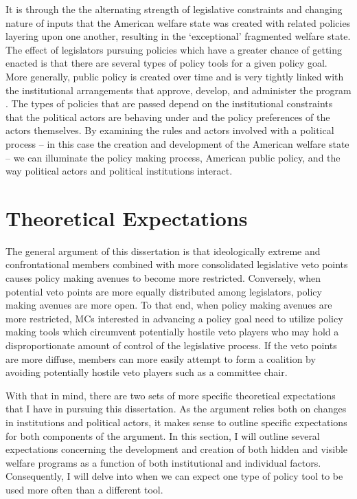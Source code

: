 \documentclass[12pt]{article}
\begin{document}
It is through the the alternating strength of legislative constraints and changing nature of inputs that the American welfare state was created with related policies layering upon one another, resulting in the `exceptional' fragmented welfare state. The effect of legislators pursuing policies which have a greater chance of getting enacted is that there are several types of policy tools for a given policy goal. More generally, public policy is created over time and is very tightly linked with the institutional arrangements that approve, develop, and administer the program \citep{pierson2004b}. The types of policies that are passed depend on the institutional constraints that the political actors are behaving under and the policy preferences of the actors themselves. By examining the rules and actors involved with a political process -- in this case the creation and development of the American welfare state -- we can illuminate the policy making process, American public policy, and the way political actors and political institutions interact.

\section{Theoretical Expectations}
\citep{wawro2001}
\citep{evans2004}
The general argument of this dissertation is that ideologically extreme and confrontational members combined with more consolidated legislative veto points causes policy making avenues to become more restricted. Conversely, when potential veto points are more equally distributed among legislators, policy making avenues are more open. To that end, when policy making avenues are more restricted, MCs interested in advancing a policy goal need to utilize policy making tools which circumvent potentially hostile veto players who may hold a disproportionate amount of control of the legislative process. If the veto points are more diffuse, members can more easily attempt to form a coalition by avoiding potentially hostile veto players such as a committee chair.

With that in mind, there are two sets of more specific theoretical expectations that I have in pursuing this dissertation. As the argument relies both on changes in institutions and political actors, it makes sense to outline specific expectations for both components of the argument. In this section, I will outline several expectations concerning the development and creation of both hidden and visible welfare programs as a function of both institutional and individual factors. Consequently, I will delve into when we can expect one type of policy tool to be used more often than a different tool.
\end{document}
